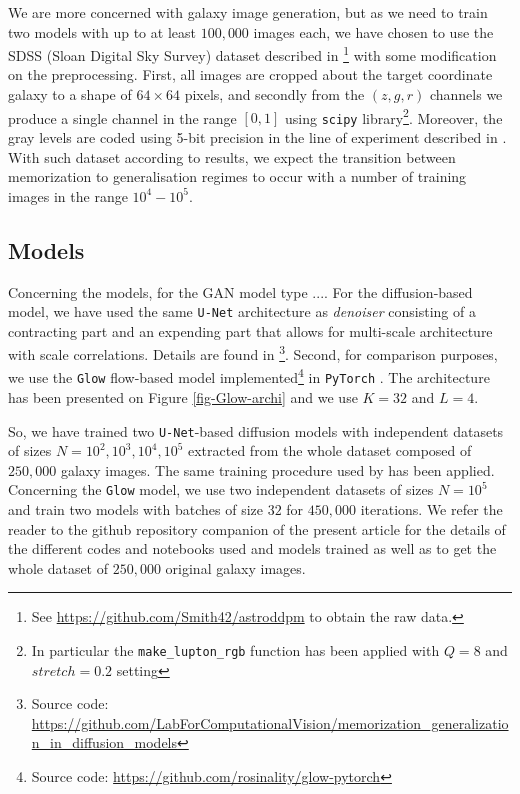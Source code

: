 \documentclass[11pt]{amsart}
\begin{document}
We are more concerned with galaxy image generation, but as we need to train two models with up to at least $100,000$ images each, we have chosen to use the SDSS (Sloan Digital Sky Survey) dataset described in \citep{smith2021}\footnote{See \url{https://github.com/Smith42/astroddpm} to obtain the raw data.} with some modification on the preprocessing. First, all images are cropped about the target coordinate galaxy to a shape of $64\times 64$ pixels, and secondly from the $(z,g,r)$ channels we produce a single  channel in the range $[0,1]$ using \texttt{scipy} \citep{2020SciPy-NMeth} library\footnote{In particular the \texttt{make\_lupton\_rgb} function has been applied with $Q=8$ and $stretch=0.2$ setting}. Moreover, the gray levels are coded using 5-bit precision in the line of experiment described in \cite{Kingma2018}. With such dataset according to \cite{kadkhodaie2024generalization} results, we expect the transition between memorization to generalisation regimes to occur with a number of training images in the range $10^4-10^5$. 

\subsection{Models}
%
{\color{red} Concerning the models, for the GAN model type ....  
For the diffusion-based model, we have used the same \texttt{U-Net} architecture \citep{2015arXiv150504597R}  as \textit{denoiser} consisting of a contracting part and an expending part that allows for multi-scale architecture with scale correlations. Details are found in \cite{kadkhodaie2024generalization}\footnote{Source code:  \url{https://github.com/LabForComputationalVision/memorization_generalization_in_diffusion_models}}. Second, for comparison purposes, we use the \texttt{Glow} flow-based model implemented\footnote{Source code: \url{https://github.com/rosinality/glow-pytorch}} in \texttt{PyTorch}  \citep{PyTorch2019}. The architecture has been presented on Figure \ref{fig-Glow-archi} and we use $K=32$ and $L=4$.}


So, we have trained two \texttt{U-Net}-based diffusion models with independent datasets of sizes  $N=10^2,10^3,10^4,10^5$ extracted from the whole dataset composed of $250,000$ galaxy images. The same training procedure used by \cite{kadkhodaie2024generalization} has been applied. Concerning the \texttt{Glow} model, we use two independent datasets of sizes $N=10^5$ and train two models with  batches of size $32$ for $450,000$ iterations. {\color{red} We refer the reader to the  github repository companion of the present article for the details of the different codes and notebooks used and models trained as well as to get the whole dataset of $250,000$ original galaxy images.}
%
\end{document}

